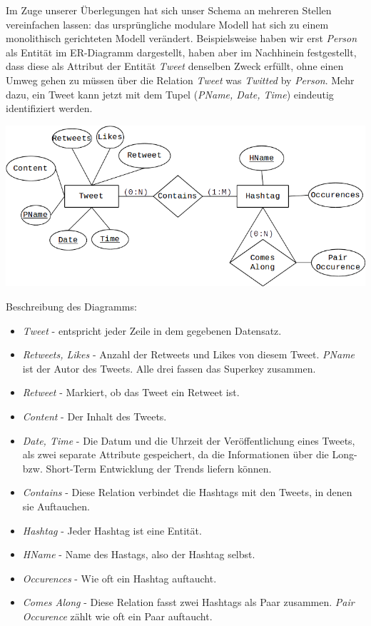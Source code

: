 \documentclass[paper=a4, english, ngerman, romanian]{scrartcl}
\begin{document}
	
	Im Zuge unserer Überlegungen hat sich unser Schema an mehreren Stellen vereinfachen lassen: das ursprüngliche modulare Modell hat sich zu einem monolithisch gerichteten Modell verändert. Beispielsweise haben wir erst \textit{Person} als Entität im ER-Diagramm dargestellt, haben aber im Nachhinein festgestellt, dass diese als Attribut der Entität \textit{Tweet} denselben Zweck erfüllt, ohne einen Umweg gehen zu müssen über die Relation \textit{Tweet} was \textit{Twitted} by \textit{Person}. Mehr dazu, ein Tweet kann jetzt mit dem Tupel (\textit{PName, Date, Time}) eindeutig identifiziert werden.
		
	\begin{center}
	\includegraphics[scale=0.6]{MinMax_Diagram2}
	\end{center}
	
	Beschreibung des Diagramms:
	
	\begin{itemize}
	\item \textit{Tweet} - entspricht jeder Zeile in dem gegebenen Datensatz.
	\item \textit{Retweets, Likes} - Anzahl der Retweets und Likes von diesem Tweet. \textit{PName} ist der Autor des Tweets. Alle drei fassen das Superkey zusammen.
	\item \textit{Retweet} - Markiert, ob das Tweet ein Retweet ist.
	\item \textit{Content} - Der Inhalt des Tweets.
	\item \textit{Date, Time} - Die Datum und die Uhrzeit der Veröffentlichung eines Tweets, als zwei separate Attribute gespeichert, da die Informationen über die Long- bzw. Short-Term Entwicklung der Trends liefern können.
	\item \textit{Contains} - Diese Relation verbindet die Hashtags mit den Tweets, in denen sie Auftauchen.
	\item \textit{Hashtag} - Jeder Hashtag ist eine Entität.
	\item \textit{HName} - Name des Hastags, also der Hashtag selbst.
	\item \textit{Occurences} - Wie oft ein Hashtag auftaucht.
	\item \textit{Comes Along} - Diese Relation fasst zwei Hashtags als Paar zusammen. \textit{Pair Occurence} zählt wie oft ein Paar auftaucht.
	\end{itemize}
\end{document}
